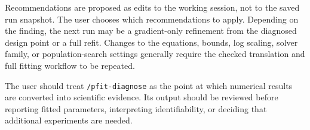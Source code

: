 Recommendations are proposed as edits to the working session, not to the saved
run snapshot. The user chooses which recommendations to apply. Depending on the
finding, the next run may be a gradient-only refinement from the diagnosed design
point or a full refit. Changes to the equations, bounds, log scaling, solver
family, or population-search settings generally require the checked translation
and full fitting workflow to be repeated.

The user should treat \texttt{/pfit-diagnose} as the point at which numerical
results are converted into scientific evidence. Its output should be reviewed
before reporting fitted parameters, interpreting identifiability, or deciding
that additional experiments are needed.
